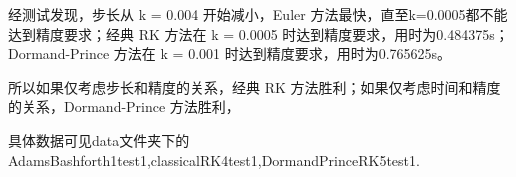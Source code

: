 \documentclass[12]{article}%
\begin{document}
经测试发现，步长从 k = 0.004 开始减小，Euler 方法最快，直至k=0.0005都不能达到精度要求；经典 RK 方法在
k = 0.0005 时达到精度要求，用时为0.484375s；Dormand-Prince 方法在
k = 0.001 时达到精度要求，用时为0.765625s。

所以如果仅考虑步长和精度的关系，经典 RK 方法胜利；如果仅考虑时间和精度的关系，Dormand-Prince 方法胜利，

具体数据可见data文件夹下的AdamsBashforth1test1,classicalRK4test1,DormandPrinceRK5test1.
\end{document}

